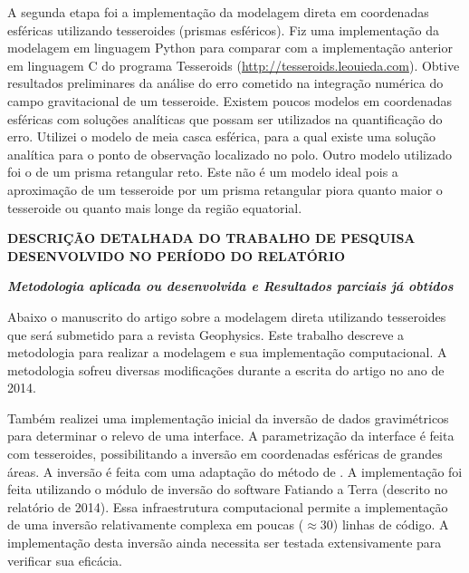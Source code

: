 \documentclass[12pt,a4paper]{article}
\begin{document}
A segunda etapa foi a implementação da modelagem direta em coordenadas
esféricas utilizando tesseroides (prismas esféricos).
Fiz uma implementação da modelagem em linguagem Python para comparar com a
implementação anterior em linguagem C do programa Tesseroids
(\href{http://tesseroids.leouieda.com}{http://tesseroids.leouieda.com}).
Obtive resultados preliminares da análise do erro cometido na integração
numérica do campo gravitacional de um tesseroide.
Existem poucos modelos em coordenadas esféricas com soluções analíticas que
possam ser utilizados na quantificação do erro.
Utilizei o modelo de meia casca esférica, para a qual existe uma solução
analítica para o ponto de observação localizado no polo.
Outro modelo utilizado foi o de um prisma retangular reto.
Este não é um modelo ideal pois a aproximação de um tesseroide por um prisma
retangular piora quanto maior o tesseroide ou quanto mais longe da região
equatorial.



\newpage

\begin{center}
\textbf{\large DESCRIÇÃO DETALHADA DO TRABALHO DE PESQUISA DESENVOLVIDO NO
PERÍODO DO RELATÓRIO}
\end{center}

\vspace{1cm}

{\centering\bfseries\itshape
Metodologia aplicada ou desenvolvida
e
Resultados parciais já obtidos
\par}

\bigskip

Abaixo o manuscrito do artigo sobre a
modelagem direta utilizando tesseroides
que será submetido para a revista Geophysics.
Este trabalho descreve a metodologia para realizar a modelagem e sua
implementação computacional.
A metodologia sofreu diversas modificações durante a escrita do artigo
no ano de 2014.

Também realizei uma implementação inicial da inversão de dados gravimétricos
para determinar o relevo de uma interface.
A parametrização da interface é feita com tesseroides, possibilitando a
inversão em coordenadas esféricas de grandes áreas.
A inversão é feita com uma adaptação do método de \citet{Silva2014}.
A implementação foi feita utilizando o módulo de inversão do software
Fatiando a Terra (descrito no relatório de 2014).
Essa infraestrutura computacional permite a implementação de uma inversão
relativamente complexa em poucas ($\approx30$) linhas de código.
A implementação desta inversão ainda necessita ser testada extensivamente
para verificar sua eficácia.
\end{document}
